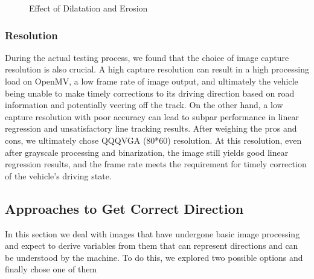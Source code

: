 \documentclass[12pt, a4paper, oneside]{report}
\begin{document}
\begin{figure}[H]
  \centering
  \hspace{0.5cm}
  \caption{Effect of Dilatation and Erosion}
  \label{fig:tr}
\end{figure}

\subsubsection*{Resolution}
During the actual testing process, we found that the choice of image capture resolution is also crucial. A high capture resolution can result in a high processing load on OpenMV, a low frame rate of image output, and ultimately the vehicle being unable to make timely corrections to its driving direction based on road information and potentially veering off the track. On the other hand, a low capture resolution with poor accuracy can lead to subpar performance in linear regression and unsatisfactory line tracking results. After weighing the pros and cons, we ultimately chose QQQVGA (80*60) resolution. At this resolution, even after grayscale processing and binarization, the image still yields good linear regression results, and the frame rate meets the requirement for timely correction of the vehicle's driving state.

\subsection{Approaches to Get Correct Direction}	
In this section we deal with images that have undergone basic image processing and expect to derive variables from them that can represent directions and can be understood by the machine. To do this, we explored two possible options and finally chose one of them
\end{document}
